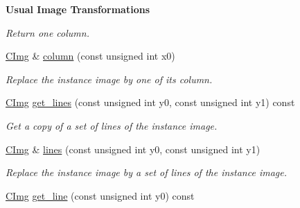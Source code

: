 \begin{Indent}{\bf Usual Image Transformations}
\begin{DoxyCompactItemize}
\begin{DoxyCompactList}\small\item\em Return one column. \item\end{DoxyCompactList}\item 
\hypertarget{structcimg__library_1_1_c_img_a1fdbb6196417dc8083941372356c1617}{
\hyperlink{structcimg__library_1_1_c_img}{CImg} \& \hyperlink{structcimg__library_1_1_c_img_a1fdbb6196417dc8083941372356c1617}{column} (const unsigned int x0)}
\label{structcimg__library_1_1_c_img_a1fdbb6196417dc8083941372356c1617}

\begin{DoxyCompactList}\small\item\em Replace the instance image by one of its column. \item\end{DoxyCompactList}\item 
\hypertarget{structcimg__library_1_1_c_img_a0d393319ea3287de4296a0fcb00d7ad6}{
\hyperlink{structcimg__library_1_1_c_img}{CImg} \hyperlink{structcimg__library_1_1_c_img_a0d393319ea3287de4296a0fcb00d7ad6}{get\_\-lines} (const unsigned int y0, const unsigned int y1) const }
\label{structcimg__library_1_1_c_img_a0d393319ea3287de4296a0fcb00d7ad6}

\begin{DoxyCompactList}\small\item\em Get a copy of a set of lines of the instance image. \item\end{DoxyCompactList}\item 
\hypertarget{structcimg__library_1_1_c_img_a2eccc05034e6f91bcb82aa0b1b580a25}{
\hyperlink{structcimg__library_1_1_c_img}{CImg} \& \hyperlink{structcimg__library_1_1_c_img_a2eccc05034e6f91bcb82aa0b1b580a25}{lines} (const unsigned int y0, const unsigned int y1)}
\label{structcimg__library_1_1_c_img_a2eccc05034e6f91bcb82aa0b1b580a25}

\begin{DoxyCompactList}\small\item\em Replace the instance image by a set of lines of the instance image. \item\end{DoxyCompactList}\item 
\hypertarget{structcimg__library_1_1_c_img_aa26c97d13f11c389f4822795e83d5ba5}{
\hyperlink{structcimg__library_1_1_c_img}{CImg} \hyperlink{structcimg__library_1_1_c_img_aa26c97d13f11c389f4822795e83d5ba5}{get\_\-line} (const unsigned int y0) const }
\label{structcimg__library_1_1_c_img_aa26c97d13f11c389f4822795e83d5ba5}


\end{DoxyCompactItemize}
\end{Indent}
